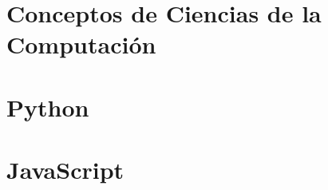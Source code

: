 \documentclass[12pt, a4paper, openany]{book} %
\begin{document}


\tableofcontents
\listoftables
\listoffigures





\part{Conceptos de Ciencias de la Computación}


\part{Python}



\part{JavaScript}

\end{document}
